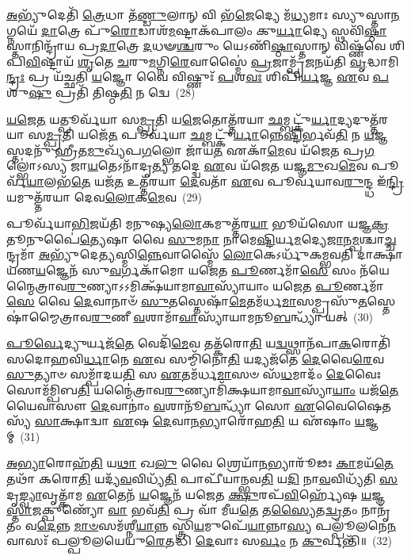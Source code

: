 \-\ul{𑌅}\-𑌭𑍍𑌯𑍁᳴𑌦𑍇𑌤𑌿᳴ \ul{𑌤𑍍𑌰𑍇}\-𑌧𑌾 𑌤᳴\-\ul{𑌣𑍍𑌡𑍁}\-𑌲𑌾𑌨𑍍 𑌵𑌿 𑌭᳴\-\ul{𑌜𑍇}\-𑌦𑍍𑌯𑍇 𑌮᳴\-\ul{𑌧𑍍𑌯}\-𑌮𑌾𑌃 𑌸𑍍𑌯𑍁𑌸𑍍𑌤𑌾\-\ul{𑌨}\-𑌗𑍍𑌨𑌯𑍇᳴ \ul{𑌦𑌾}\-𑌤𑍍𑌰𑍇 𑌪𑍁᳴\-\ul{𑌰𑍋}\-𑌡𑌾𑌶᳴\-\ul{𑌮}\-𑌷𑍍𑌟𑌾𑌕᳴𑌪𑌾𑌲𑌂 𑌕𑍁\-\ul{𑌰𑍍𑌯𑌾}\-𑌦𑍍𑌯𑍇 𑌸𑍍𑌥𑌵𑌿᳴\-\ul{𑌷𑍍𑌠𑌾}\-𑌸𑍍𑌤𑌾𑌨𑌿𑌨𑍍𑌦𑍍𑌰𑌾᳴𑌯 𑌪𑍍𑌰\-\ul{𑌦𑌾}\-𑌤𑍍𑌰𑍇 \ul{𑌦}\-𑌧𑍟\-\ul{𑌶𑍍𑌚}\-𑌰𑍁𑌂 𑌯𑍇\-𑌽𑌣𑌿᳴\-\ul{𑌷𑍍𑌠𑌾}\-𑌸𑍍𑌤𑌾𑌨𑍍 𑌵𑌿𑌷𑍍𑌣᳴𑌵𑍇 𑌶𑌿𑌪𑌿\-\ul{𑌵𑌿}\-𑌷𑍍𑌟𑌾𑌯᳴ \ul{𑌶𑍃}\-𑌤𑍇 \ul{𑌚}\-𑌰𑍁\-\ul{𑌮}\-𑌗𑍍𑌨𑌿\-\ul{𑌰𑍇}\-𑌵𑌾𑌸𑍍𑌮𑍈॑ \ul{𑌪𑍍𑌰}\-𑌜𑌾𑌮𑍍𑌪𑍍𑌰᳴\-\ul{𑌜}\-𑌨𑌯᳴𑌤𑌿 \ul{𑌵𑍃}\-𑌦𑍍𑌧𑌾𑌮𑌿\-\ul{𑌨𑍍𑌦𑍍𑌰𑌃} 𑌪𑍍𑌰 𑌯᳴𑌚𑍍𑌛𑌤𑌿 \ul{𑌯}\-𑌜𑍍𑌞𑍋 𑌵𑍈 𑌵𑌿𑌷𑍍𑌣𑍁𑌃᳴ \ul{𑌪}\-𑌶\-\ul{𑌵𑌃} 𑌶𑌿𑌪𑌿᳴\-\ul{𑌰𑍍𑌯}\-𑌜𑍍𑌞 \ul{𑌏}\-𑌵 \ul{𑌪}\-𑌶𑍁\-\ul{𑌷𑍁} 𑌪𑍍𑌰𑌤𑌿᳴ 𑌤𑌿𑌷𑍍𑌠\-\ul{𑌤𑌿} 𑌨 𑌦𑍍𑌵𑍇~(28)

\-\ul{𑌯}\-\-\ul{𑌜𑍇}\-\-\ul{𑌤} 𑌯𑌤𑍍𑌪𑍂𑌰𑍍𑌵᳴𑌯𑌾 𑌸\-\ul{𑌮𑍍𑌪𑍍𑌰}\-𑌤𑌿 𑌯\-\ul{𑌜𑍇}\-𑌤𑍋𑌤𑍍𑌤᳴𑌰𑌯𑌾 \ul{𑌛}\-𑌮𑍍𑌬𑌟𑍍𑌕𑍁᳴\-\ul{𑌰𑍍𑌯𑌾}\-𑌦𑍍𑌯𑌦𑍁𑌤𑍍𑌤᳴𑌰𑌯𑌾 𑌸\-\ul{𑌮𑍍𑌪𑍍𑌰}\-𑌤𑌿 𑌯𑌜𑍇᳴\-\ul{𑌤} 𑌪𑍂𑌰𑍍𑌵᳴𑌯𑌾 \ul{𑌛}\-𑌮𑍍𑌬𑌟𑍍𑌕𑍁᳴\-\ul{𑌰𑍍𑌯𑌾}\-𑌨𑍍𑌨𑍇\-\ul{𑌷𑍍𑌟𑌿}\-𑌰𑍍𑌭𑌵᳴\-\ul{𑌤𑌿} 𑌨 \ul{𑌯}\-𑌜𑍍𑌞𑌸𑍍𑌤𑌦𑌨𑍁᳴ 𑌹𑍍𑌰𑍀𑌤\-\ul{𑌮𑍁}\-𑌖𑍍𑌯᳴𑌪\-\ul{𑌗}\-𑌲𑍍𑌭𑍋 𑌜𑌾᳴𑌯\-\ul{𑌤} 𑌏𑌕𑌾᳴\-\ul{𑌮𑍇}\-𑌵 𑌯᳴𑌜𑍇𑌤 𑌪𑍍𑌰\-\ul{𑌗}\-𑌲𑍍𑌭𑍋॑\-𑌽𑌸𑍍𑌯 𑌜𑌾\-\ul{𑌯}\-𑌤𑍇\-𑌽𑌨𑌾᳴𑌦𑍃\-\ul{𑌤𑍍𑌯} 𑌤𑌦𑍍𑌦𑍍𑌵𑍇 \ul{𑌏}\-𑌵 𑌯᳴𑌜𑍇𑌤 𑌯𑌜𑍍𑌞\-\ul{𑌮𑍁}\-𑌖\-\ul{𑌮𑍇}\-𑌵 𑌪𑍂𑌰𑍍𑌵᳴\-\ul{𑌯𑌾}\-𑌲𑌭᳴\-\ul{𑌤𑍇} 𑌯𑌜᳴\-\ul{𑌤} 𑌉𑌤𑍍𑌤᳴𑌰𑌯𑌾 \ul{𑌦𑍇}\-𑌵𑌤𑌾᳴ \ul{𑌏}\-𑌵 𑌪𑍂𑌰𑍍𑌵᳴𑌯𑌾𑌵\-\ul{𑌰𑍁}\-𑌨𑍍𑌦𑍍𑌧 𑌇᳴\-\ul{𑌨𑍍𑌦𑍍𑌰𑌿}\-𑌯𑌮𑍁𑌤𑍍𑌤᳴𑌰𑌯𑌾 𑌦𑍇𑌵\-\ul{𑌲𑍋}\-𑌕\-\ul{𑌮𑍇}\-𑌵~(29)

𑌪𑍂𑌰𑍍𑌵᳴𑌯𑌾\-\ul{𑌭𑌿}\-𑌜𑌯᳴𑌤𑌿 𑌮𑌨𑍁𑌷𑍍𑌯\-\ul{𑌲𑍋}\-𑌕𑌮𑍁𑌤𑍍𑌤᳴𑌰\-\ul{𑌯𑌾} 𑌭𑍂𑌯᳴𑌸𑍋 𑌯𑌜𑍍𑌞\-\ul{𑌕𑍍𑌰}\-𑌤𑍂𑌨𑍁𑌪𑍈॑\-\ul{𑌤𑍍𑌯𑍇}\-𑌷𑌾 𑌵𑍈 \ul{𑌸𑍁}\-𑌮\-\ul{𑌨𑌾} 𑌨𑌾𑌮𑍇\-\ul{𑌷𑍍𑌟𑌿}\-𑌰𑍍𑌯\-\ul{𑌮}\-𑌦𑍍𑌯𑍇\-\ul{𑌜𑌾}\-𑌨\-\ul{𑌮𑍍𑌪}\-𑌶𑍍𑌚𑌾\-\ul{𑌚𑍍𑌚}\-𑌨𑍍𑌦𑍍𑌰𑌮𑌾᳴ \ul{𑌅}\-𑌭𑍍𑌯𑍁᳴𑌦𑍇\-\ul{𑌤𑍍𑌯}\-𑌸𑍍𑌮𑌿\-\ul{𑌨𑍍𑌨𑍇}\-𑌵𑌾𑌸𑍍𑌮𑍈᳴ \ul{𑌲𑍋}\-𑌕𑍇\-𑌽𑌰𑍍𑌧𑍁᳴𑌕𑌮𑍍𑌭𑌵𑌤𑌿 𑌦𑌾𑌕𑍍𑌷𑌾𑌯𑌣\-\ul{𑌯}\-𑌜𑍍𑌞𑍇𑌨᳴ 𑌸𑍁\-\ul{𑌵}\-𑌰𑍍𑌗𑌕𑌾᳴𑌮𑍋 𑌯𑌜𑍇𑌤 \ul{𑌪𑍂}\-𑌰𑍍𑌣𑌮𑌾᳴\-\ul{𑌸𑍇} 𑌸𑌂 𑌨᳴𑌯𑍇𑌨𑍍𑌮𑍈𑌤𑍍𑌰𑌾𑌵\-\ul{𑌰𑍁}\-𑌣𑍍𑌯𑌾\-𑌽\-𑌽\-𑌮𑌿𑌕𑍍𑌷᳴𑌯𑌾𑌮𑌾\-\ul{𑌵𑌾}\-𑌸𑍍𑌯𑌾᳴𑌯𑌾𑌂 𑌯𑌜𑍇𑌤 \ul{𑌪𑍂}\-𑌰𑍍𑌣𑌮𑌾᳴\-\ul{𑌸𑍇} 𑌵𑍈 \ul{𑌦𑍇}\-𑌵𑌾𑌨𑌾𑍞᳴ \ul{𑌸𑍁}\-𑌤𑌸𑍍𑌤𑍇𑌷𑌾᳴\-\ul{𑌮𑍇}\-𑌤𑌮᳴𑌰𑍍𑌧\-\ul{𑌮𑌾}\-𑌸𑌮𑍍𑌪𑍍𑌰𑌸𑍁᳴\-\ul{𑌤}\-𑌸𑍍𑌤𑍇𑌷𑌾॑𑌮𑍍𑌮𑍈𑌤𑍍𑌰𑌾𑌵\-\ul{𑌰𑍁}\-𑌣𑍀 \ul{𑌵}\-𑌶𑌾𑌮𑌾᳴\-\ul{𑌵𑌾}\-𑌸𑍍𑌯𑌾᳴𑌯𑌾𑌮𑌨𑍂\-\ul{𑌬}\-𑌨𑍍𑌧𑍍𑌯𑌾᳴ 𑌯𑌤𑍍~(30)

\-\ul{𑌪𑍂}\-\-\ul{𑌰𑍍𑌵𑍇}\-𑌦𑍍𑌯𑍁𑌰𑍍𑌯𑌜᳴\-\ul{𑌤𑍇} 𑌵𑍇𑌦𑌿᳴\-\ul{𑌮𑍇}\-𑌵 𑌤𑌤𑍍𑌕᳴𑌰𑍋\-\ul{𑌤𑌿} 𑌯\-\ul{𑌦𑍍𑌵}\-𑌥𑍍𑌸𑌾𑌨᳴𑌪𑌾\-\ul{𑌕}\-𑌰𑍋𑌤𑌿᳴ 𑌸𑌦𑍋𑌹𑌵𑌿\-\ul{𑌰𑍍𑌧𑌾}\-𑌨𑍇 \ul{𑌏}\-𑌵 𑌸𑌮𑍍𑌮𑌿᳴𑌨𑍋\-\ul{𑌤𑌿} 𑌯𑌦𑍍𑌯𑌜᳴𑌤𑍇 \ul{𑌦𑍇}\-𑌵𑍈\-\ul{𑌰𑍇}\-𑌵 \ul{𑌸𑍁}\-𑌤𑍍𑌯𑌾𑍞 𑌸𑌮𑍍𑌪𑌾᳴𑌦𑌯\-\ul{𑌤𑌿} 𑌸 \ul{𑌏}\-𑌤𑌮᳴𑌰𑍍𑌧\-\ul{𑌮𑌾}\-𑌸𑍞 𑌸᳴\-\ul{𑌧}\-𑌮𑌾𑌦𑌂᳴ \ul{𑌦𑍇}\-𑌵𑍈𑌃 𑌸𑍋𑌮᳴𑌮𑍍𑌪𑌿𑌬\-\ul{𑌤𑌿} 𑌯𑌨𑍍𑌮𑍈॑𑌤𑍍𑌰𑌾𑌵\-\ul{𑌰𑍁}\-𑌣𑍍𑌯𑌾𑌮𑌿᳴𑌕𑍍𑌷𑌯𑌾𑌮𑌾\-\ul{𑌵𑌾}\-𑌸𑍍𑌯𑌾᳴\-\ul{𑌯𑌾𑌂} 𑌯𑌜᳴\-\ul{𑌤𑍇} 𑌯𑍈𑌵𑌾𑌸𑍗 \ul{𑌦𑍇}\-𑌵𑌾𑌨𑌾𑌂॑ \ul{𑌵}\-𑌶𑌾𑌨𑍂᳴\-\ul{𑌬}\-𑌨𑍍𑌧𑍍𑌯𑌾᳴ 𑌸𑍋 \ul{𑌏}\-𑌵𑍈𑌷𑍈𑌤𑌸𑍍𑌯᳴ \ul{𑌸𑌾}\-𑌕𑍍𑌷𑌾𑌦𑍍𑌵𑌾 \ul{𑌏}\-𑌷 \ul{𑌦𑍇}\-𑌵𑌾\-\ul{𑌨}\-𑌭𑍍𑌯𑌾𑌰𑍋᳴𑌹\-\ul{𑌤𑌿} 𑌯 𑌏᳴𑌷𑌾𑌂 \ul{𑌯}\-𑌜𑍍𑌞𑌮𑍍~(31)

\-\ul{𑌅}\-\-\ul{𑌭𑍍𑌯𑌾}\-𑌰𑍋𑌹᳴\-\ul{𑌤𑌿} 𑌯\-\ul{𑌥𑌾} 𑌖\-\ul{𑌲𑍁} 𑌵𑍈 𑌶𑍍𑌰𑍇𑌯𑌾᳴\-\ul{𑌨}\-𑌭𑍍𑌯𑌾𑌰𑍂᳴𑌢𑌃 \ul{𑌕𑌾}\-𑌮𑌯᳴\-\ul{𑌤𑍇} 𑌤𑌥𑌾᳴ 𑌕𑌰𑍋\-\ul{𑌤𑌿} 𑌯𑌦𑍍𑌯᳴\-\ul{𑌵}\-𑌵𑌿𑌧𑍍𑌯᳴\-\ul{𑌤𑌿} 𑌪𑌾𑌪𑍀᳴𑌯𑌾𑌨𑍍𑌭𑌵\-\ul{𑌤𑌿} 𑌯\-\ul{𑌦𑌿} 𑌨𑌾\-\ul{𑌵}\-𑌵𑌿𑌧𑍍𑌯᳴𑌤𑌿 \ul{𑌸}\-𑌦𑍃\-\ul{𑌙𑍍𑌵𑍍𑌯𑌾}\-𑌵𑍃𑌤𑍍𑌕𑌾᳴𑌮 \ul{𑌏}\-𑌤𑍇𑌨᳴ \ul{𑌯}\-𑌜𑍍𑌞𑍇𑌨᳴ 𑌯𑌜𑍇𑌤 \ul{𑌕𑍍𑌷𑍁}\-𑌰𑌪᳴\-\ul{𑌵𑌿}\-𑌰𑍍\mbox{}𑌹𑍍𑌯𑍇᳴𑌷 \ul{𑌯}\-𑌜𑍍𑌞\-\ul{𑌸𑍍𑌤𑌾}\-𑌜𑌕𑍍𑌪𑍁𑌣𑍍𑌯𑍋᳴ \ul{𑌵𑌾} 𑌭𑌵᳴\-\ul{𑌤𑌿} 𑌪𑍍𑌰 𑌵𑌾᳴ 𑌮𑍀𑌯\-\ul{𑌤𑍇} 𑌤\-\ul{𑌸𑍍𑌯𑍈}\-𑌤\-\ul{𑌦𑍍𑌵𑍍𑌰}\-𑌤𑌂 𑌨𑌾𑌨𑍃᳴𑌤𑌂 𑌵\-\ul{𑌦𑍇}\-𑌨𑍍𑌨 \ul{𑌮𑌾}\-\-\ul{𑍞}\-𑌸𑌮᳴𑌶𑍍𑌨𑍀\-\ul{𑌯𑌾}\-𑌨𑍍𑌨 𑌸𑍍𑌤𑍍𑌰𑌿\-\ul{𑌯}\-𑌮𑍁𑌪𑍇᳴\-\ul{𑌯𑌾}\-𑌨𑍍𑌨𑌾\-\ul{𑌸𑍍𑌯} 𑌪𑌲𑍍𑌪𑍂᳴𑌲𑌨𑍇\-\ul{𑌨} 𑌵𑌾𑌸𑌃᳴ 𑌪𑌲𑍍𑌪𑍂𑌲𑌯𑍇𑌯𑍁\-\ul{𑌰𑍇}\-𑌤𑌦𑍍𑌧𑌿 \ul{𑌦𑍇}\-𑌵𑌾𑌃 𑌸\-\ul{𑌰𑍍𑌵𑌂} 𑌨 \ul{𑌕𑍁}\-𑌰𑍍𑌵𑌨𑍍𑌤𑌿᳴॥~(32)

